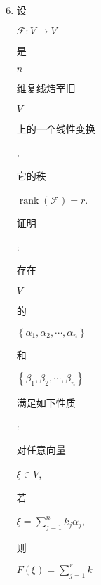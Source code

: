 \documentclass[10pt]{article}
\begin{document}
\begin{enumerate}
  \setcounter{enumi}{5}
  \item \begin{CJK}{UTF8}{mj}设\end{CJK} $\mathscr{F}: V \rightarrow V$ \begin{CJK}{UTF8}{mj}是\end{CJK} $n$ \begin{CJK}{UTF8}{mj}维复线焅宰旧\end{CJK} $V$ \begin{CJK}{UTF8}{mj}上的一个线性变换\end{CJK}, \begin{CJK}{UTF8}{mj}它的秩\end{CJK} $\operatorname{rank}(\mathscr{F})=r$. \begin{CJK}{UTF8}{mj}证明\end{CJK}: \begin{CJK}{UTF8}{mj}存在\end{CJK} $V$ \begin{CJK}{UTF8}{mj}的\end{CJK} $\left\{\alpha_{1}, \alpha_{2}, \cdots, \alpha_{n}\right\}$ \begin{CJK}{UTF8}{mj}和\end{CJK} $\left\{\beta_{1}, \beta_{2}, \cdots, \beta_{n}\right\}$ \begin{CJK}{UTF8}{mj}满足如下性质\end{CJK}: \begin{CJK}{UTF8}{mj}对任意向量\end{CJK} $\xi \in V$, \begin{CJK}{UTF8}{mj}若\end{CJK} $\xi=\sum_{j=1}^{n} k_{j} \alpha_{j}$, \begin{CJK}{UTF8}{mj}则\end{CJK} $F(\xi)=\sum_{j=1}^{r} k$


\end{enumerate}
\end{document}

